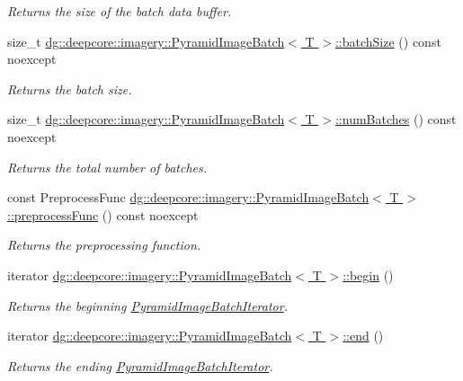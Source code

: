 \begin{DoxyCompactItemize}
\begin{DoxyCompactList}\small\item\em Returns the size of the batch data buffer. \end{DoxyCompactList}\item 
size\+\_\+t \hyperlink{group___imagery_module_gac5041040cb2396c35286067a6be232bc}{dg\+::deepcore\+::imagery\+::\+Pyramid\+Image\+Batch$<$ T $>$\+::batch\+Size} () const noexcept
\begin{DoxyCompactList}\small\item\em Returns the batch size. \end{DoxyCompactList}\item 
size\+\_\+t \hyperlink{group___imagery_module_gadda0749e3c2b759418c8d148858198a9}{dg\+::deepcore\+::imagery\+::\+Pyramid\+Image\+Batch$<$ T $>$\+::num\+Batches} () const noexcept
\begin{DoxyCompactList}\small\item\em Returns the total number of batches. \end{DoxyCompactList}\item 
const Preprocess\+Func \hyperlink{group___imagery_module_gaf8e7737e6e0119039d2d755781450508}{dg\+::deepcore\+::imagery\+::\+Pyramid\+Image\+Batch$<$ T $>$\+::preprocess\+Func} () const noexcept
\begin{DoxyCompactList}\small\item\em Returns the preprocessing function. \end{DoxyCompactList}\item 
iterator \hyperlink{group___imagery_module_ga536737967e4276b646aadc432cce9ca3}{dg\+::deepcore\+::imagery\+::\+Pyramid\+Image\+Batch$<$ T $>$\+::begin} ()
\begin{DoxyCompactList}\small\item\em Returns the beginning \hyperlink{classdg_1_1deepcore_1_1imagery_1_1_pyramid_image_batch_iterator}{Pyramid\+Image\+Batch\+Iterator}. \end{DoxyCompactList}\item 
iterator \hyperlink{group___imagery_module_ga7e2fa7f2608bc1784f52c8f165fcc2f7}{dg\+::deepcore\+::imagery\+::\+Pyramid\+Image\+Batch$<$ T $>$\+::end} ()
\begin{DoxyCompactList}\small\item\em Returns the ending \hyperlink{classdg_1_1deepcore_1_1imagery_1_1_pyramid_image_batch_iterator}{Pyramid\+Image\+Batch\+Iterator}. \end{DoxyCompactList}\item 

\end{DoxyCompactItemize}
